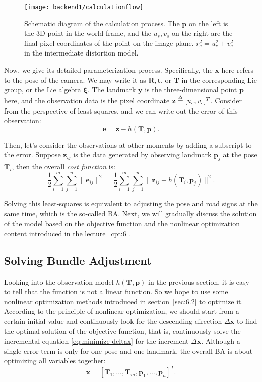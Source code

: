 \begin{figure}[!htp]
	\centering
	\texttt{[image: backend1/calculationflow]}
	\caption{Schematic diagram of the calculation process. The $\mathbf{p}$ on the left is the 3D point in the world frame, and the $u_s, v_s$ on the right are the final pixel coordinates of the point on the image plane. $r_c^2=u_c^2 + v_c^2$ in the intermediate distortion model.}
	\label{fig:calculationflow}
\end{figure}


Now, we give its detailed parameterization process. Specifically, the $\mathbf{x}$ here refers to the pose of the camera. We may write it as $\mathbf{R}, \mathbf{t}$, or $\mathbf{T }$ in the corresponding Lie group, or the  Lie algebra $\mathbf{\xi}$. The landmark $\mathbf{y}$ is the three-dimensional point $\mathbf{p}$ here, and the observation data is the pixel coordinate $\mathbf{z} \buildrel \Delta \over = [u_s, v_s]^T $. Consider from the perspective of least-squares, and we can write out the error of this observation:
\begin{equation}
	\mathbf{e} = \mathbf{z} - h(\mathbf{T}, \mathbf{p}).
\end{equation}

Then, let's consider the observations at other moments by adding a subscript to the error. Suppose $\mathbf{z}_{ij}$ is the data generated by observing landmark $\mathbf{p}_j$ at the pose $\mathbf{T}_i$, then the overall \textit{cost function} is:
\begin{equation}
	\label{eq:BAcostfunction}
	\frac{1}{2}\sum_{i=1}^m \sum_{j=1}^n \| \mathbf{e}_{ij} \|^2 = \frac{1}{2}\sum_{i=1}^m\sum_{j=1}^n \|
	\mathbf{{z}}_{ij} - h(\mathbf{T}_{i},\mathbf{p}_j) \|^2 .
\end{equation}


Solving this least-squares is equivalent to adjusting the pose and road signs at the same time, which is the so-called BA. Next, we will gradually discuss the solution of the model based on the objective function and the nonlinear optimization content introduced in the lecture~\ref{cpt:6}.

\subsection{Solving Bundle Adjustment}
Looking into the observation model $h(\mathbf{T}, \mathbf{p})$ in the previous section, it is easy to tell that the function is not a linear function. So we hope to use some nonlinear optimization methods introduced in section~\ref{sec:6.2} to optimize it. According to the principle of nonlinear optimization, we should start from a certain initial value and continuously look for the descending direction $\Delta \mathbf{x}$ to find the optimal solution of the objective function, that is, continuously solve the incremental equation \eqref{eq:minimize-deltax} for the increment $\Delta \mathbf{x}$. Although a single error term is only for one pose and one landmark, the overall BA is about optimizing all variables together:
\begin{equation}
	\mathbf{x} = [ \mathbf{T}_1, \ldots, \mathbf{T}_m, \mathbf{p}_1, \ldots, \mathbf{p}_n ]^T.
\end{equation}

